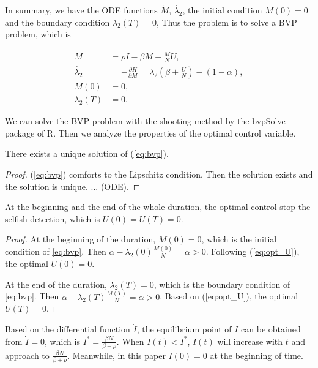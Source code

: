 In summary, we have the ODE functions $\dot{M}$, $\dot{\lambda_{2}}$,
the initial condition $M(0)=0$ and the boundary condition $\lambda_{2}(T)=0$,
Thus the problem is to solve a BVP problem,
which is
\begin{small}
\begin{equation}
\label{eq:bvp}
\begin{aligned}
\dot{M} &= \rho I  - \beta M - \frac{M}{N} U,\\
\dot{\lambda_{2}} &= - \frac{ \partial H}{ \partial M} = \lambda_{2} (\beta + \frac{U}{N} ) - (1-\alpha),\\
M(0) &= 0,\\
\lambda_{2}(T) &= 0.
\end{aligned}
\end{equation}
\end{small}
We can solve the BVP problem with the shooting method by the bvpSolve package of R.
Then we analyze the properties of the optimal control variable.
\begin{lem}
There exists a unique solution of (\ref{eq:bvp}).
\end{lem}
\begin{proof}
(\ref{eq:bvp}) comforts to the Lipschitz condition.
Then the solution exists and the solution is unique. ... (ODE).
\end{proof}

\begin{lem}At the beginning and the end of the whole duration,
the optimal control stop the selfish detection,
which is $U(0)=U(T)=0$.
\end{lem}

\begin{proof}
At the beginning of the duration, $M(0)=0$,
which is the initial condition of \ref{eq:bvp}.
Then $\alpha - \lambda_{2}(0) \frac{M(0)}{N} = \alpha > 0$.
Following (\ref{eq:opt_U}), the optimal $U(0)=0$.

At the end of the duration, $\lambda_{2}(T)=0$,
which is the boundary condition of \ref{eq:bvp}.
Then $\alpha - \lambda_{2}(T) \frac{M(T)}{N} = \alpha > 0$.
Based on (\ref{eq:opt_U}), the optimal $U(T)=0$.
\end{proof}

Based on the differential function $\dot{I}$,
the equilibrium point of $I$ can be obtained from $\dot{I}=0$,
which is $I^{*}=\frac{\beta N}{\beta+\rho}$.
When $I(t)<I^{*}$, $I(t)$ will increase with $t$ and approach to $\frac{\beta N}{\beta+\rho}$.
Meanwhile, in this paper $I(0)=0$ at the beginning of time.

